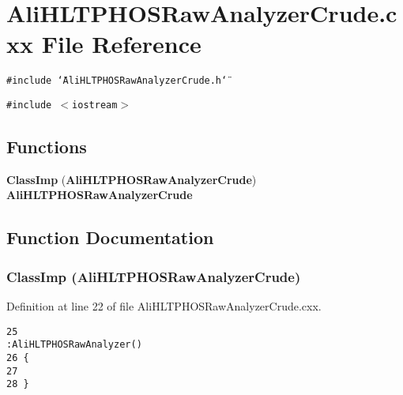 \section{Ali\-HLTPHOSRaw\-Analyzer\-Crude.cxx File Reference}
\label{AliHLTPHOSRawAnalyzerCrude_8cxx}


{\tt \#include \char`\"{}Ali\-HLTPHOSRaw\-Analyzer\-Crude.h\char`\"{}}\par
{\tt \#include $<$iostream$>$}\par
\subsection*{Functions}
\begin{CompactItemize}
\item 
{\bf Class\-Imp} ({\bf Ali\-HLTPHOSRaw\-Analyzer\-Crude}) {\bf Ali\-HLTPHOSRaw\-Analyzer\-Crude}
\end{CompactItemize}


\subsection{Function Documentation}
\subsubsection{\setlength{\rightskip}{0pt plus 5cm}Class\-Imp ({\bf Ali\-HLTPHOSRaw\-Analyzer\-Crude})}\label{AliHLTPHOSRawAnalyzerCrude_8cxx_a0}




Definition at line 22 of file Ali\-HLTPHOSRaw\-Analyzer\-Crude.cxx.

\footnotesize\begin{verbatim}25                                                                                        :AliHLTPHOSRawAnalyzer()
26 {
27 
28 }
\end{verbatim}\normalsize 


